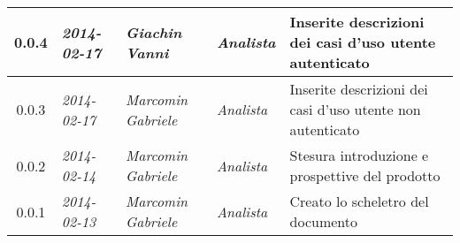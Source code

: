 \begin{small}
\begin{tabular}{|c|p{1.8cm}|p{2.8cm}|p{2.8cm}|p{3.5cm}|}
\hline
0.0.4 & \textit{2014-02-17} &
\textit{Giachin Vanni} &
\textit{Analista} &  Inserite descrizioni dei casi d'uso utente autenticato\\
\hline
0.0.3 & \textit{2014-02-17} &
\textit{Marcomin Gabriele} &
\textit{Analista} &  Inserite descrizioni dei casi d'uso utente non autenticato\\
\hline
0.0.2 & \textit{2014-02-14} & 
\textit{Marcomin Gabriele} &
\textit{Analista} &  Stesura introduzione e prospettive del prodotto\\
\hline
0.0.1 & \textit{2014-02-13} &
\textit{Marcomin Gabriele} &
\textit{Analista} &  Creato lo scheletro del documento\\
\hline
\end{tabular}
\end{small}